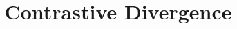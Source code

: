 \documentclass{beamer}
\title[Contrastive Divergence]{Contrastive Divergence}
\numberwithin{equation}{section}%
\begin{document}
\begin{frame}
  \titlepage%
\end{frame}


%
%
%
%

%


%
%
\end{document}
